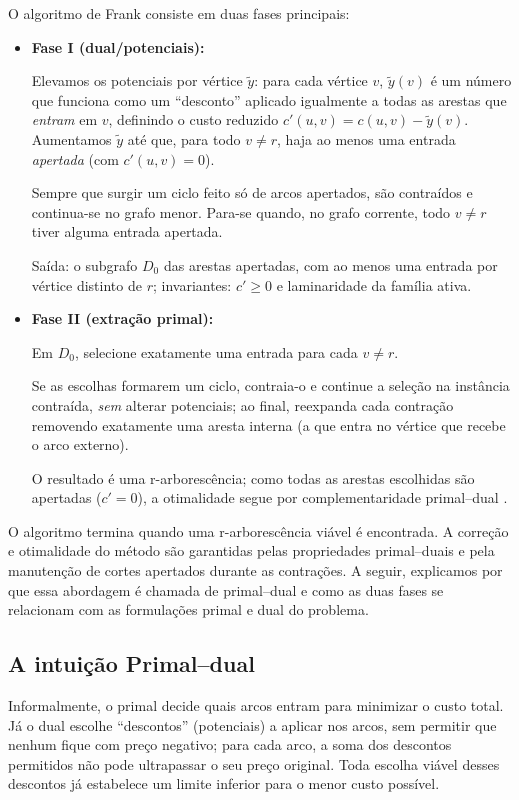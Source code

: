 O algoritmo de Frank consiste em duas fases principais:
\begin{itemize}\setlength{\itemsep}{2pt}
	\item \textbf{Fase I (dual/potenciais):}

	      Elevamos os potenciais por vértice \(\tilde y\): para cada vértice \(v\), \(\tilde y(v)\) é um número que funciona como um “desconto” aplicado igualmente a todas as arestas que \emph{entram} em \(v\), definindo o custo reduzido \(c'(u,v)=c(u,v)-\tilde y(v)\). Aumentamos \(\tilde y\) até que, para todo \(v\neq r\), haja ao menos uma entrada \emph{apertada} (com \(c'(u,v)=0\)).


	      Sempre que surgir um ciclo feito só de arcos apertados, são contraídos e continua-se no grafo menor. Para-se quando, no grafo corrente, todo \(v\neq r\) tiver alguma entrada apertada.


	      Saída: o subgrafo \(D_0\) das arestas apertadas, com ao menos uma entrada por vértice distinto de \(r\); invariantes: \(c'\ge 0\) e laminaridade da família ativa.
	\item \textbf{Fase II (extração primal):}

	      Em \(D_0\), selecione exatamente uma entrada para cada \(v\neq r\).

	      Se as escolhas formarem um ciclo, contraia-o e continue a seleção na instância contraída, \emph{sem} alterar potenciais; ao final, reexpanda cada contração removendo exatamente uma aresta interna (a que entra no vértice que recebe o arco externo).

	      O resultado é uma r-arborescência; como todas as arestas escolhidas são apertadas (\(c'=0\)), a otimalidade segue por complementaridade primal–dual \cite{frank1981,frank2014,schrijver2003comb}.
\end{itemize}


O algoritmo termina quando uma r-arborescência viável é encontrada. A correção e otimalidade do método são garantidas pelas propriedades primal–duais e pela manutenção de cortes apertados durante as contrações.
A seguir, explicamos por que essa abordagem é chamada de primal–dual e como as duas fases se relacionam com as formulações primal e dual do problema.

\subsection{A intuição Primal–dual}

Informalmente, o primal decide quais arcos entram para minimizar o custo total. Já o dual escolhe “descontos” (potenciais) a aplicar nos arcos, sem permitir que nenhum fique com preço negativo; para cada arco, a soma dos descontos permitidos não pode ultrapassar o seu preço original. Toda escolha viável desses descontos já estabelece um limite inferior para o menor custo possível.

